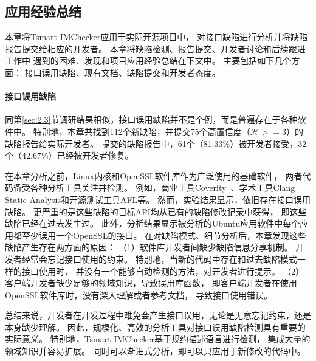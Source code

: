 \subsection{应用经验总结}
本章将Tsmart-IMChecker应用于实际开源项目中，
对接口缺陷进行分析并将缺陷报告提交给相应的开发者。
本章将缺陷检测、报告提交、开发者讨论和后续跟进工作中
遇到的困难、发现和项目应用经验总结在下文中。
主要包括如下几个方面：
接口误用缺陷、现有文档、缺陷提交和开发者态度。

\paragraph{接口误用缺陷}
同第\ref{sec:2.3}节调研结果相似，接口误用缺陷并不是个例，而是普遍存在于各种软件中。
特别地，本章共找到112个新缺陷，并提交75个高置信度（$\mathcal{H}>=3$）的缺陷报告给实际开发者。
提交的缺陷报告中，61个（81.33\%）被开发者接受，32个（42.67\%）已经被开发者修复。

在本章分析之前，Linux内核和OpenSSL软件库作为广泛使用的基础软件，
两者代码备受各种分析工具关注并检测。
例如，商业工具Coverity~\cite{coverity}、学术工具Clang Static Analysis和开源测试工具AFL等。
然而，实验结果显示，依旧存在接口误用缺陷。
更严重的是这些缺陷的目标API均从已有的缺陷修改记录中获得，
即这些缺陷已经在过去发生过。
此外，分析结果显示被分析的Ubuntu应用软件中每个应用都至少误用一个OpenSSL的接口。
在对缺陷模式、细节分析后，本章发现这些缺陷产生存在两方面的原因：
（1）软件库开发者间缺少缺陷信息分享机制。
开发者经常会忘记接口使用的约束。
特别地，当新的代码中存在和过去缺陷模式一样的接口使用时，
并没有一个能够自动检测的方法，对开发者进行提示。
（2）客户端开发者缺少足够的领域知识，导致误用库函数，
即客户端开发者在使用OpenSSL软件库时，没有深入理解或者参考文档，
导致接口使用错误。

总结来说，开发者在开发过程中难免会产生接口误用，无论是无意忘记约束，还是本身缺少理解。
因此，规模化、高效的分析工具对接口误用缺陷检测具有重要的实际意义。
特别地，Tsmart-IMChecker基于规约描述语言进行检测，
集成大量的领域知识并容易扩展。
同时可以渐进式分析，即可以只应用于新修改的代码中。


